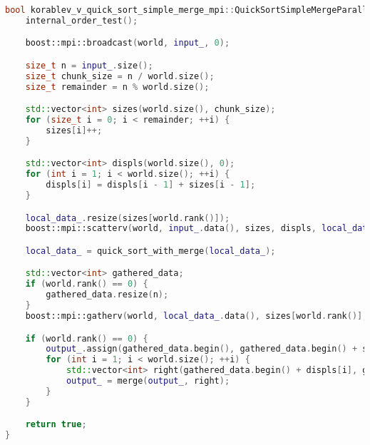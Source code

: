 \documentclass[12pt]{article}
\begin{document}
\begin{lstlisting}[language=C++]
bool korablev_v_quick_sort_simple_merge_mpi::QuickSortSimpleMergeParallel::run() {
    internal_order_test();

    boost::mpi::broadcast(world, input_, 0);

    size_t n = input_.size();
    size_t chunk_size = n / world.size();
    size_t remainder = n % world.size();

    std::vector<int> sizes(world.size(), chunk_size);
    for (size_t i = 0; i < remainder; ++i) {
        sizes[i]++;
    }

    std::vector<int> displs(world.size(), 0);
    for (int i = 1; i < world.size(); ++i) {
        displs[i] = displs[i - 1] + sizes[i - 1];
    }

    local_data_.resize(sizes[world.rank()]);
    boost::mpi::scatterv(world, input_.data(), sizes, displs, local_data_.data(), sizes[world.rank()], 0);

    local_data_ = quick_sort_with_merge(local_data_);

    std::vector<int> gathered_data;
    if (world.rank() == 0) {
        gathered_data.resize(n);
    }
    boost::mpi::gatherv(world, local_data_.data(), sizes[world.rank()], gathered_data.data(), sizes, displs, 0);

    if (world.rank() == 0) {
        output_.assign(gathered_data.begin(), gathered_data.begin() + sizes[0]);
        for (int i = 1; i < world.size(); ++i) {
            std::vector<int> right(gathered_data.begin() + displs[i], gathered_data.begin() + displs[i] + sizes[i]);
            output_ = merge(output_, right);
        }
    }

    return true;
}
\end{lstlisting}
\end{document}
